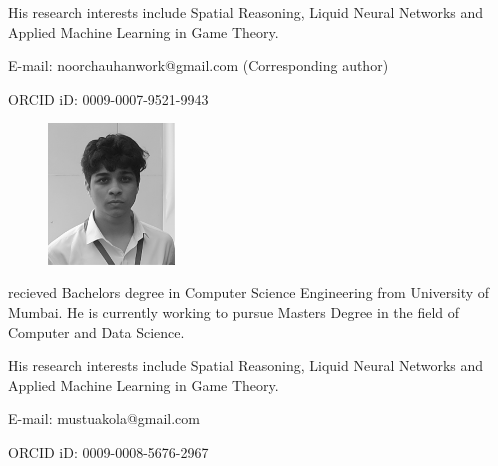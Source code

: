 \documentclass[pdflatex,sn-mathphys-num]{sn-jnl}%
\theoremstyle{thmstyleone}%
\theoremstyle{thmstyletwo}%
\theoremstyle{thmstylethree}%
\begin{document}
His research interests include Spatial Reasoning, Liquid Neural Networks and Applied Machine Learning in Game Theory.

E-mail: noorchauhanwork@gmail.com (Corresponding author)

ORCID iD: 0009-0007-9521-9943

\begin{figure}[H]%
\centering
\includegraphics[width=0.3\textwidth]{figures/Musthafa.eps}
\end{figure}

 recieved Bachelors degree in Computer Science Engineering from University of Mumbai. He is currently working to pursue Masters Degree in the field of Computer and Data Science.

His research interests include Spatial Reasoning, Liquid Neural Networks and Applied Machine Learning in Game Theory.

E-mail: mustuakola@gmail.com

ORCID iD: 0009-0008-5676-2967
\end{document}
